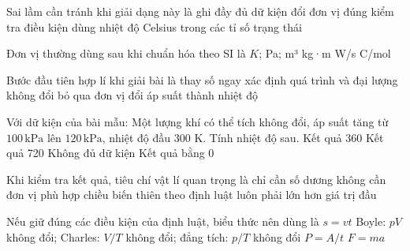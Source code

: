 \begin{ex}
Sai lầm cần tránh khi giải dạng này là
\choice
{ghi đầy đủ dữ kiện}
{đổi đơn vị đúng}
{kiểm tra điều kiện}
{\True dùng nhiệt độ Celsius trong các tỉ số trạng thái}
\end{ex}

\begin{ex}
Đơn vị thường dùng sau khi chuẩn hóa theo SI là
\choice
{\True $K$; Pa; m³}
{kg·m}
{W/s}
{C/mol}
\end{ex}

\begin{ex}
Bước đầu tiên hợp lí khi giải bài là
\choice
{thay số ngay}
{\True xác định quá trình và đại lượng không đổi}
{bỏ qua đơn vị}
{đổi áp suất thành nhiệt độ}
\end{ex}

\begin{ex}
Với dữ kiện của bài mẫu: Một lượng khí có thể tích không đổi, áp suất tăng từ $100\,\text{kPa}$ lên $120\,\text{kPa}$, nhiệt độ đầu 300 K. Tính nhiệt độ sau.
\choice
{\True Kết quả 360}
{Kết quả 720}
{Không đủ dữ kiện}
{Kết quả bằng 0}
\end{ex}

\begin{ex}
Khi kiểm tra kết quả, tiêu chí vật lí quan trọng là
\choice
{chỉ cần số dương}
{không cần đơn vị}
{\True phù hợp chiều biến thiên theo định luật}
{luôn phải lớn hơn giá trị đầu}
\end{ex}

\begin{ex}
Nếu giữ đúng các điều kiện của định luật, biểu thức nên dùng là
\choice
{$s=vt$}
{\True Boyle: $pV$ không đổi; Charles: $V/T$ không đổi; đẳng tích: $p/T$ không đổi}
{$P=A/t$}
{$F=ma$}
\end{ex}


